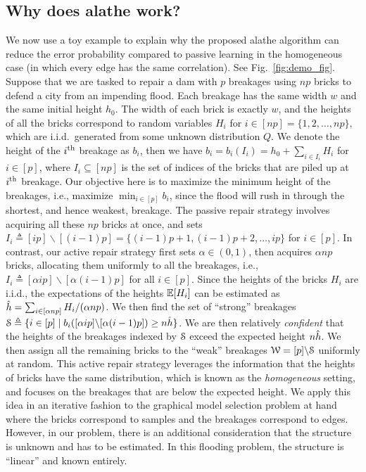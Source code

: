 \subsection{Why does \ac{alathe} work?} \label{sec:work}
We now use a toy example to explain why the proposed \ac{alathe} algorithm can reduce the error probability compared to  passive learning in the homogeneous case (in which every edge has the same correlation). See Fig.~\ref{fig:demo_fig}. Suppose that we are tasked   to repair a dam with $p$ breakages using $np$ bricks to defend a city from an impending flood. Each breakage has the same width $w$ and the same initial height $h_{0}$. The width of each 
brick is exactly $w$, and the heights of all the bricks correspond to random variables $H_{i}$ for $i\in[np]=\{1,2,\ldots, np\}$, which are i.i.d.\ generated from some unknown distribution $Q$. We denote the height of the $i^{\rm th}$ breakage as $b_{i}$, then we have 
$b_{i}=b_{i}(I_{i})=h_{0}+\sum_{i\in I_{i}} H_{i}$ for $i\in[p]$, where $I_{i}\subseteq [np]$ is the set of indices of the bricks that are piled up at $i^{\rm th}$ breakage. Our objective here is to maximize the minimum height of the  breakages,  i.e., 
maximize $\min_{i\in[p]} b_{i}$, since the flood will rush in through the shortest, and hence weakest, breakage. The passive repair strategy involves acquiring all these $np$ bricks at once, and sets $I_{i} \triangleq [ip]\backslash[(i-1)p]=\{(i-1)p+1,(i-1)p+2,\ldots,ip\}$ for $i\in[p]$. 
In contrast, our active repair strategy first sets $\alpha \in (0,1)$, then acquires $\alpha np$ bricks, allocating them uniformly to all the breakages, i.e., $I_{i}\triangleq  [\alpha ip]\backslash[\alpha(i-1)p]$ for all $i\in [p]$. Since the heights of the bricks $H_i$ are i.i.d., the expectations of the heights $\mathbb{E}[H_i]$ 
can be estimated as $\hat{h}=\sum_{i\in[\alpha np]} H_{i}/(\alpha np)$. We then find the set of ``strong'' breakages $\mathcal{S} \triangleq \{i\in[p] \mid  b_{i}([\alpha ip]\backslash[\alpha(i-1)p])\geq n\hat{h}\}$. We are then relatively \emph{confident} that 
the heights of the breakages indexed by $\mathcal{S}$ exceed the expected height $n\hat{h}$. We then assign all the remaining bricks to the ``weak'' breakages $\mathcal{W}=[p]\backslash\mathcal{S}$ uniformly at random. This active repair strategy leverages the information that the heights of  bricks have the same distribution, which is known as the \emph{homogeneous} setting, and focuses on the breakages that are below the expected height. We apply this idea in an iterative fashion to the graphical model selection problem at hand where the bricks correspond to samples and the breakages correspond to edges. However, in our problem, there is an additional consideration that the structure is unknown and has to be estimated. In this flooding problem, the structure is ``linear'' and known entirely.

